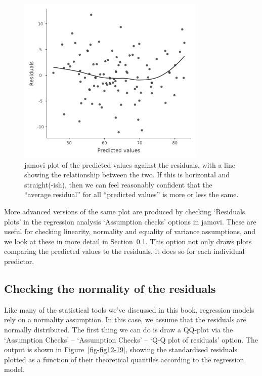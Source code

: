 \documentclass[
  a4paper,
]{book}
\begin{document}
\begin{figure}[h!]

\includegraphics[width=0.8\textwidth,height=\textheight]{images/fig12-18.png} \hfill{}

\caption{\label{fig-fig12-18}jamovi plot of the predicted values against
the residuals, with a line showing the relationship between the two. If
this is horizontal and straight(-ish), then we can feel reasonably
confident that the ``average residual'' for all ``predicted values'' is
more or less the same.}

\end{figure}

More advanced versions of the same plot are produced by checking
`Residuals plots' in the regression analysis `Assumption checks' options
in jamovi. These are useful for checking linearity, normality and
equality of variance assumptions, and we look at these in more detail in
Section~\ref{sec-Checking-the-normality-of-the-residuals}. This option
not only draws plots comparing the predicted values to the residuals, it
does so for each individual predictor.

\hypertarget{sec-Checking-the-normality-of-the-residuals}{%
\subsection{Checking the normality of the
residuals}\label{sec-Checking-the-normality-of-the-residuals}}

Like many of the statistical tools we've discussed in this book,
regression models rely on a normality assumption. In this case, we
assume that the residuals are normally distributed. The first thing we
can do is draw a QQ-plot via the `Assumption Checks' -- `Assumption
Checks' -- `Q-Q plot of residuals' option. The output is shown in
Figure~\ref{fig-fig12-19}, showing the standardised residuals plotted as
a function of their theoretical quantiles according to the regression
model.
\end{document}
